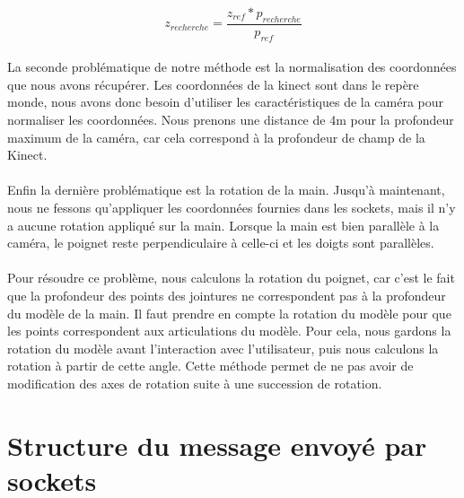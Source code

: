 \begin{equation}
 z_{recherche} = \frac{z_{ref} * p_{recherche}}{p_{ref}}
\end{equation}

\paragraph{}
La seconde problématique de notre méthode est la normalisation des coordonnées que nous avons récupérer. Les coordonnées
de la kinect sont dans le repère monde, nous avons donc besoin d'utiliser les caractéristiques de la caméra pour normaliser
les coordonnées. Nous prenons une distance de 4m pour la profondeur maximum de la caméra, car cela correspond à la profondeur 
de champ de la Kinect.

\paragraph{}
Enfin la dernière problématique est la rotation de la main. Jusqu'à maintenant, nous ne fessons qu'appliquer les coordonnées
fournies dans les sockets, mais il n'y a aucune rotation appliqué sur la main. Lorsque la main est bien parallèle à la caméra,
le poignet reste perpendiculaire à celle-ci et les doigts sont parallèles.

\paragraph{}
Pour résoudre ce problème, nous calculons la rotation du poignet, car c'est le fait que la profondeur des points des jointures
ne correspondent pas à la profondeur du modèle de la main. Il faut prendre en compte la rotation du modèle pour que les points
correspondent aux articulations du modèle. Pour cela, nous gardons la rotation du modèle avant l'interaction avec l'utilisateur,
puis nous calculons la rotation à partir de cette angle. Cette méthode permet de ne pas avoir de modification des axes de rotation
suite à une succession de rotation.


\section{Structure du message envoyé par sockets}
